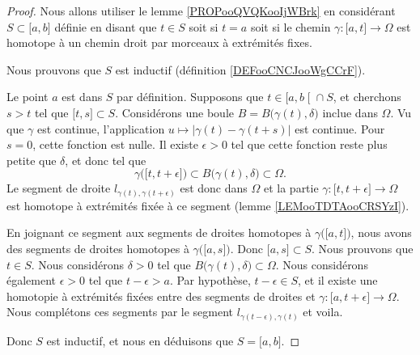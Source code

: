 \begin{proof}
	Nous allons utiliser le lemme \ref{PROPooQVQKooIjWBrk} en considérant \( S\subset \mathopen[ a , b \mathclose]\) définie en disant que \( t\in S\) soit si \( t=a\) soit si le chemin \( \gamma\colon \mathopen[ a , t \mathclose]\to \Omega \) est homotope à un chemin droit par morceaux à extrémités fixes.

	Nous prouvons que \( S\) est inductif (définition \ref{DEFooCNCJooWgCCrF}).
	\begin{subproof}
		\spitem[\( a\in S\)]
		Le point \( a\) est dans \( S\) par définition.
		\spitem[Si \( t\in S\)]
		Supposons que \( t\in \mathopen[ a , b \mathclose[\cap S\), et cherchons \( s>t\) tel que \( \mathopen[ t , s \mathclose]\subset S\). Considérons une boule \( B= B\big( \gamma(t),\delta \big)\) inclue dans \( \Omega\). Vu que \( \gamma\) est continue, l'application \( u\mapsto | \gamma(t)-\gamma(t+s) | \) est continue. Pour \( s=0\), cette fonction est nulle. Il existe \( \epsilon>0\) tel que cette fonction reste plus petite que \( \delta\), et donc tel que
		\begin{equation}
			\gamma\big( \mathopen[ t , t+\epsilon \mathclose] \big)\subset B\big( \gamma(t),\delta \big)\subset \Omega.
		\end{equation}
		Le segment de droite \( l_{\gamma(t),\gamma(t+\epsilon)} \) est donc dans \( \Omega\) et la partie \( \gamma\colon \mathopen[ t , t+\epsilon \mathclose]\to \Omega\) est homotope à extrémités fixée à ce segment (lemme \ref{LEMooTDTAooCRSYzI}).

		En joignant ce segment aux segments de droites homotopes à \(  \gamma\big( \mathopen[ a , t \mathclose] \big)  \), nous avons des segments de droites homotopes à \( \gamma\big( \mathopen[ a , s \mathclose] \big)\). Donc \( \mathopen[ a , s \mathclose]\subset S\).
		Nous prouvons que \( t\in S\). Nous considérons \( \delta>0\) tel que \( B\big( \gamma(t),\delta \big)\subset \Omega\). Nous considérons également \( \epsilon>0\) tel que \( t-\epsilon>a\). Par hypothèse, \( t-\epsilon\in S\), et il existe une homotopie à extrémités fixées entre des segments de droites et \( \gamma\colon \mathopen[ a , t+\epsilon \mathclose]\to \Omega\). Nous complétons ces segments par le segment \( l_{\gamma(t-\epsilon),\gamma(t)}\) et voila.
	\end{subproof}
	Donc \( S\) est inductif, et nous en déduisons que \( S=\mathopen[ a , b \mathclose]\).
\end{proof}

